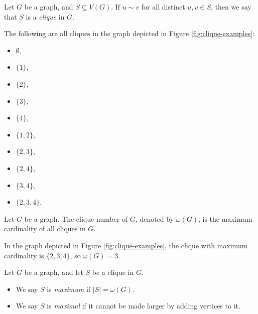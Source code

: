 \documentclass[12pt]{article}
\begin{document}
\begin{defn}
    Let $G$ be a graph, and $S \subseteq V(G)$. If $u \sim v$ for all distinct $u, v \in S$, then we say that $S$ is a \emph{clique} in $G$.
\end{defn}

\begin{exmp}
    The following are all cliques in the graph depicted in Figure \ref{fig:clique-examples}:
    \begin{multicols}{2}
        \begin{itemize}
            \item $\emptyset$,
            \item $\{1\}$,
            \item $\{2\}$,
            \item $\{3\}$,
            \item $\{4\}$,
        \end{itemize}
        \columnbreak
        \begin{itemize}
            \item $\{1, 2\}$,
            \item $\{2, 3\}$,
            \item $\{2, 4\}$,
            \item $\{3, 4\}$,
            \item $\{2, 3, 4\}$.
        \end{itemize}
    \end{multicols}
\end{exmp}

\begin{defn}
    Let $G$ be a graph. The clique number of $G$, denoted by $\omega(G)$, is the maximum cardinality of all cliques in $G$.
\end{defn}

\begin{exmp}
    In the graph depicted in Figure \ref{fig:clique-examples}, the clique with maximum cardinality is $\{2, 3, 4\}$, so $\omega(G) = 3$.
\end{exmp}

\begin{defn}
    Let $G$ be a graph, and let $S$ be a clique in $G$.
    \begin{itemize}
        \item We say $S$ is \emph{maximum} if $|S| = \omega(G)$.
        \item We say $S$ is \emph{maximal} if it cannot be made larger by adding vertices to it.
    \end{itemize}
\end{defn}
\end{document}
